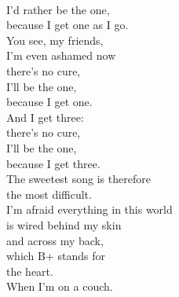 \documentclass[smalldemyvopaper,11pt,twoside,onecolumn,openright,extrafontsizes]{memoir}
\begin{document}
\\I'd rather be the one,
\\because I get one as I go.
\\You see, my friends,
\\I'm even ashamed now
\\there's no cure,
\\I'll be the one,
\\because I get one.
\\And I get three:
\\there's no cure,
\\I'll be the one,
\\because I get three.
\\The sweetest song is therefore
\\the most difficult.
\\I'm afraid everything in this world
\\is wired behind my skin
\\and across my back,
\\which B+ stands for
\\the heart.
\\When I'm on a couch.
\end{document}
